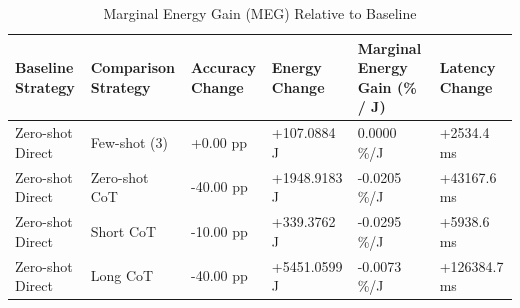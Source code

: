 \begin{table}
\caption{Marginal Energy Gain (MEG) Relative to Baseline}
\label{tab:marginal_energy_gain}
\begin{tabular}{llllll}
\toprule
Baseline Strategy & Comparison Strategy & Accuracy Change & Energy Change & Marginal Energy Gain (\% / J) & Latency Change \\
\midrule
Zero-shot Direct & Few-shot (3) & +0.00 pp & +107.0884 J & 0.0000 \%/J & +2534.4 ms \\
Zero-shot Direct & Zero-shot CoT & -40.00 pp & +1948.9183 J & -0.0205 \%/J & +43167.6 ms \\
Zero-shot Direct & Short CoT & -10.00 pp & +339.3762 J & -0.0295 \%/J & +5938.6 ms \\
Zero-shot Direct & Long CoT & -40.00 pp & +5451.0599 J & -0.0073 \%/J & +126384.7 ms \\
\bottomrule
\end{tabular}
\end{table}
